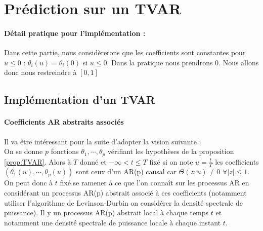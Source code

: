\documentclass{report}
\begin{document}
\section{Prédiction sur un TVAR}
\paragraph{Détail pratique pour l'implémentation :} Dans cette partie, nous considèrerons que les coefficients sont constantes pour $u \leq 0$ : $\theta_i(u) = \theta_i(0)$ si $u \leq 0$. Dans la pratique nous prendrons $0$. Nous allons donc nous restreindre à $[0,1]$
\subsection{Implémentation d'un TVAR}
\paragraph{Coefficients AR abstraits associés}
Il va être intéressant pour la suite d'adopter la vision suivante : \\
On se donne $p$ fonctions $\theta_1, \cdots, \theta_p$ vérifiant les hypothèses de la proposition \ref{prop:TVAR}. Alors à $T$ donné et $-\infty < t \leq T$ fixé si on note $u = \frac{t}{T}$ les coefficients $(\theta_1(u), \cdots , \theta_p(u))$ sont ceux d'un AR(p) causal car $\Theta(z;u) \neq 0 \,\, \forall |z| \leq 1$.\\
On peut donc à $t$ fixé se ramener à ce que l'on connaît sur les processus AR en considérant un processus AR(p) abstrait associé à ces coefficients (notamment utiliser l'algorithme de Levinson-Durbin on considérer la densité spectrale de puissance). Il y un processus AR(p) abstrait local à chaque temps $t$ et notamment une densité spectrale de puissance locale à chaque instant $t$. \\
\end{document}
